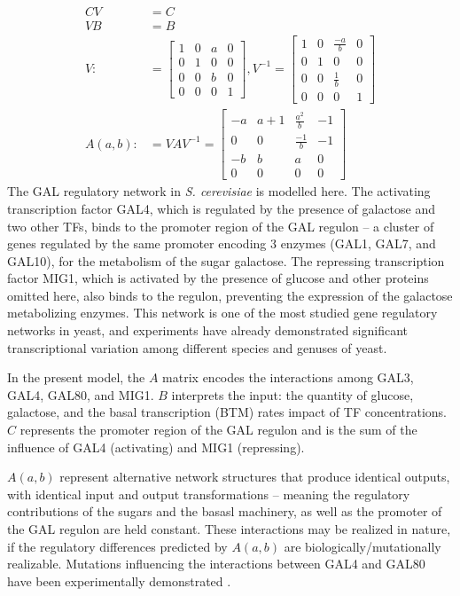 \documentclass[9 pt]{article}
\newcommand{\1}{\mathbbm{1}}
\begin{document}
\begin{multicols}{2}
    \begin{align*}
      CV &= C \\
      VB &= B \\
      V :&= \begin{bmatrix} 1 & 0 & a & 0 \\ 0 & 1 & 0 & 0 \\ 0 & 0 & b & 0 \\ 0 & 0 & 0 & 1 \end{bmatrix} , V^{-1} = \begin{bmatrix} 1 & 0 & \frac{-a}{b} & 0 \\ 0 & 1 & 0 & 0 \\ 0 & 0 & \frac{1}{b} & 0 \\ 0 & 0 & 0 & 1\end{bmatrix} \\
        A(a,b) :&= VAV^{-1} = \begin{bmatrix} -a & a+1 & \frac{a^{2}}{b} & -1 \\ 0 & 0 & \frac{-1}{b} & -1 \\ -b & b & a & 0 \\ 0 & 0 & 0 & 0 \end{bmatrix}
    \end{align*}
    The GAL regulatory network in \emph{S. cerevisiae} is modelled here. The activating transcription factor GAL4, which is regulated by the presence of galactose and two other TFs, binds to the promoter region of the GAL regulon -- a cluster of genes regulated by the same promoter encoding 3 enzymes (GAL1, GAL7, and GAL10), for the metabolism of the sugar galactose. The repressing transcription factor MIG1, which is activated by the presence of glucose and other proteins omitted here, also binds to the regulon, preventing the expression of the galactose metabolizing enzymes. This network is one of the most studied gene regulatory networks in yeast, and experiments have already demonstrated significant transcriptional variation among different species and genuses of yeast.

    In the present model, the $A$ matrix encodes the interactions among GAL3, GAL4, GAL80, and MIG1. $B$ interprets the input: the quantity of glucose, galactose, and the basal transcription (BTM) rates impact of TF concentrations. $C$ represents the promoter region of the GAL regulon and is the sum of the influence of GAL4 (activating) and MIG1 (repressing).

    $A(a,b)$ represent alternative network structures that produce identical outputs, with identical input and output transformations -- meaning the regulatory contributions of the sugars and the basasl machinery, as well as the promoter of the GAL regulon are held constant. These interactions may be realized in nature, if the regulatory differences predicted by $A(a,b)$ are biologically/mutationally realizable. Mutations influencing the interactions between GAL4 and GAL80 have been experimentally demonstrated \citep{li2010alterations}.


\end{multicols}
\end{document}
